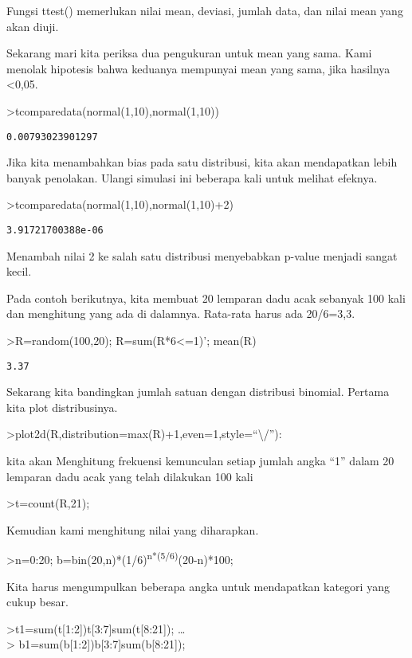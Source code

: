 \documentclass[
]{book}
\begin{document}
Fungsi ttest() memerlukan nilai mean, deviasi, jumlah data, dan nilai mean yang akan diuji.

Sekarang mari kita periksa dua pengukuran untuk mean yang sama. Kami menolak hipotesis bahwa keduanya mempunyai mean yang sama, jika hasilnya \textless0,05.

\textgreater tcomparedata(normal(1,10),normal(1,10))

\begin{verbatim}
0.00793023901297
\end{verbatim}

Jika kita menambahkan bias pada satu distribusi, kita akan mendapatkan lebih banyak penolakan. Ulangi simulasi ini beberapa kali untuk melihat efeknya.

\textgreater tcomparedata(normal(1,10),normal(1,10)+2)

\begin{verbatim}
3.91721700388e-06
\end{verbatim}

Menambah nilai 2 ke salah satu distribusi menyebabkan p-value menjadi sangat kecil.

Pada contoh berikutnya, kita membuat 20 lemparan dadu acak sebanyak 100 kali dan menghitung yang ada di dalamnya. Rata-rata harus ada 20/6=3,3.

\textgreater R=random(100,20); R=sum(R*6\textless=1)'; mean(R)

\begin{verbatim}
3.37
\end{verbatim}

Sekarang kita bandingkan jumlah satuan dengan distribusi binomial. Pertama kita plot distribusinya.

\textgreater plot2d(R,distribution=max(R)+1,even=1,style=``\textbackslash/''):

kita akan Menghitung frekuensi kemunculan setiap jumlah angka ``1'' dalam 20 lemparan dadu acak yang telah dilakukan 100 kali

\textgreater t=count(R,21);

Kemudian kami menghitung nilai yang diharapkan.

\textgreater n=0:20; b=bin(20,n)*(1/6)\textsuperscript{n*(5/6)}(20-n)*100;

Kita harus mengumpulkan beberapa angka untuk mendapatkan kategori yang cukup besar.

\textgreater t1=sum(t{[}1:2{]})\textbar t{[}3:7{]}\textbar sum(t{[}8:21{]}); \ldots{}\\
\textgreater{} b1=sum(b{[}1:2{]})\textbar b{[}3:7{]}\textbar sum(b{[}8:21{]});
\end{document}
